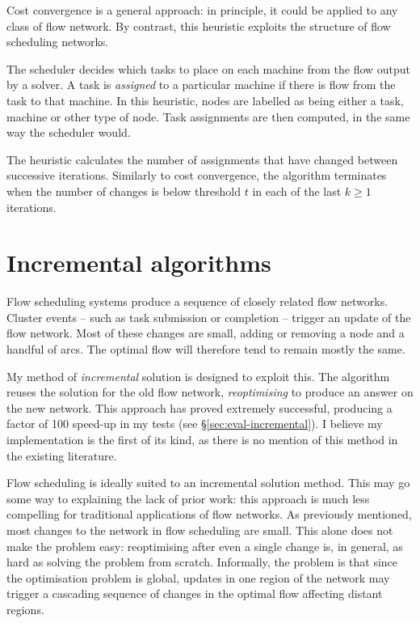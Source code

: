 Cost convergence is a general approach: in principle, it could be applied to any class of flow network. By contrast, this heuristic exploits the structure of flow scheduling networks.

The scheduler decides which tasks to place on each machine from the flow output by a solver. A task is \emph{assigned} to a particular machine if there is flow from the task to that machine. In this heuristic, nodes are labelled as being either a task, machine or other type of node. Task assignments are then computed, in the same way the scheduler would.

The heuristic calculates the number of assignments that have changed between successive iterations. Similarly to cost convergence, the algorithm terminates when the number of changes is below threshold $t$ in each of the last $k \geq 1$ iterations.


\section{Incremental algorithms} \label{sec:impl-incremental}

Flow scheduling systems produce a sequence of closely related flow networks. Cluster events -- such as task submission or completion -- trigger an update of the flow network. Most of these changes are small, adding or removing a node and a handful of arcs. The optimal flow will therefore tend to remain mostly the same. 

My method of \emph{incremental} solution is designed to exploit this. The algorithm reuses the solution for the old flow network, \emph{reoptimising} to produce an answer on the new network. This approach has proved extremely successful, producing a factor of 100 speed-up in my tests (see \S\ref{sec:eval-incremental}). I believe my implementation is the first of its kind, as there is no mention of this method in the existing literature.

Flow scheduling is ideally suited to an incremental solution method. This may go some way to explaining the lack of prior work: this approach is much less compelling for traditional applications of flow networks. As previously mentioned, most changes to the network in flow scheduling are small. This alone does not make the problem easy: reoptimising after even a single change is, in general, as hard as solving the problem from scratch\footnotemark. Informally, the problem is that since the optimisation problem is global, updates in one region of the network may trigger a cascading sequence of changes in the optimal flow affecting distant regions.

